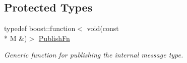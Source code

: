 \subsection*{Protected Types}
\begin{DoxyCompactItemize}
\item 
\hypertarget{classimage__transport_1_1_simple_publisher_plugin_a01bd11cb3ee6b7ce6715a3b57feadf93}{typedef boost\-::function$<$ void(const \\*
M \&)$>$ \hyperlink{classimage__transport_1_1_simple_publisher_plugin_a01bd11cb3ee6b7ce6715a3b57feadf93}{Publish\-Fn}}\label{classimage__transport_1_1_simple_publisher_plugin_a01bd11cb3ee6b7ce6715a3b57feadf93}

\begin{DoxyCompactList}\small\item\em Generic function for publishing the internal message type. \end{DoxyCompactList}\end{DoxyCompactItemize}
